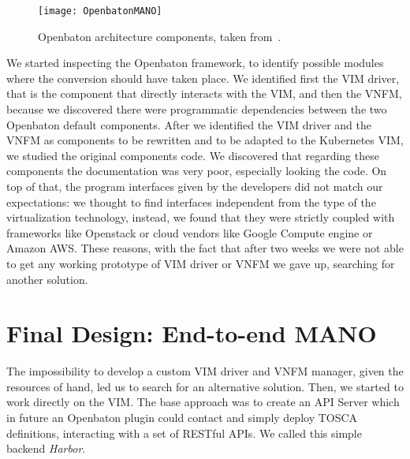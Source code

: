 \begin{figure}[t]
  \centering
  \texttt{[image: OpenbatonMANO]}
  \caption[Openbaton architecture components]{Openbaton architecture components,
    taken from~\cite{openbatondocumentation}.}
  \label{chap:archimpl:sec:secondattempt:img:openbatonMANO}
\end{figure}

We started inspecting the Openbaton framework, to identify possible modules
where the conversion should have taken place. We identified first the VIM
driver, that is the component that directly interacts with the VIM, and then the
VNFM, because we discovered there were programmatic dependencies between the two
Openbaton default components. After we identified the VIM driver and the VNFM as
components to be rewritten and to be adapted to the Kubernetes VIM, we studied
the original components code. We discovered that regarding these components the
documentation was very poor, especially looking the code. On top of that, the
program interfaces given by the developers did not match our expectations: we
thought to find interfaces independent from the type of the virtualization
technology, instead, we found that they were strictly coupled with frameworks
like Openstack or cloud vendors like Google Compute engine or Amazon AWS. These
reasons, with the fact that after two weeks we were not able to get any working
prototype of VIM driver or VNFM we gave up, searching for another solution.

\section{Final Design: End-to-end MANO}

The impossibility to develop a custom VIM driver and VNFM manager, given the
resources of hand, led us to search for an alternative solution. Then, we
started to work directly on the VIM. The base approach was to create an API
Server which in future an Openbaton plugin could contact and simply deploy TOSCA
definitions, interacting with a set of RESTful APIs. We called this simple
backend \emph{Harbor}.

